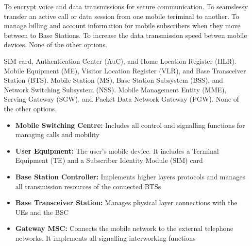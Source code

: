 \begin{checkboxes}
    \choice To encrypt voice and data transmissions for secure communication.
    \choice To seamslessy transfer an active call or data session from one mobile teriminal to another.
    \choice To manage billing and account information for mobile subscribers when they move between to Base Stations.
    \choice To increase the data transmission speed betwen mobile devices.
    \CorrectChoice None of the other options.
\end{checkboxes}

\begin{checkboxes}
    \CorrectChoice SIM card, Authentication Center (AuC), and Home Location Register (HLR).
    \choice Mobile Equipment (ME), Visitor Location Register (VLR), and Base Transceiver Station (BTS).
    \choice Mobile Station (MS), Base Station Subsystem (BSS), and Network Switching Subsystem (NSS).
    \choice Mobile Management Entity (MME), Serving Gateway (SGW), and Packet Data Network Gateway (PGW).
    \choice None of the other options.
\end{checkboxes}

\begin{solution}
    \begin{itemize}
        \item \textbf{Mobile Switching Centre:} Includes all control and signalling functions for managing calls and mobility
        \item \textbf{User Equipment:} The user's mobile device. It includes a Terminal Equipment (TE) and a Subscriber Identity Module (SIM) card
        \item \textbf{Base Station Controller:} Implements higher layers protocols and manages all transmission resources of the connected BTSs
        \item \textbf{Base Transceiver Station:} Manages physical layer connections with the UEs and the BSC
        \item \textbf{Gateway MSC:} Connects the mobile network to the external telephone networks. It implements all signalling interworking functions 
    \end{itemize}
\end{solution}

